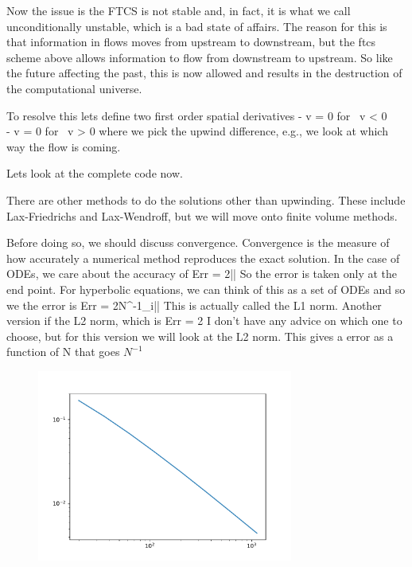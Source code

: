Now the issue is the FTCS is not stable and, in fact, it is what we call unconditionally unstable, which is a bad state of affairs.  The reason for this is that information in flows moves from upstream to downstream, but the ftcs scheme above allows information to flow from downstream to upstream.  So like the future affecting the past, this is now allowed and results in the destruction of the computational universe.  

To resolve this lets define two first order spatial derivatives
\be
{} - v = 0 \qquad\textrm{for\ } v < 0\\
 - v = 0 \qquad\textrm{for\ } v > 0 
\ee
where we pick the upwind difference, e.g., we look at which way the flow is coming.  

Lets look at the complete code now.



There are other methods to do the solutions other than upwinding.  These include Lax-Friedrichs and Lax-Wendroff, but we will move onto finite volume methods.   

Before doing so, we should discuss convergence. Convergence is the measure of how accurately a numerical method reproduces the exact solution.  In the case of ODEs, we care about the accuracy of 
\be
{\rm Err} = 2\left|\right|
\ee
So the error is taken only at the end point.  For hyperbolic equations, we can think of this as a set of ODEs and so we the error is 
\be
{\rm Err} = 2N^{-1}\sum_i\left|\right|
\ee
This is actually called the L1 norm. Another version if the L2 norm, which is 
\be
{\rm Err} = 2
\ee
I don't have any advice on which one to choose, but for this version we will look at the L2 norm.  This gives a error as a function of N that goes $N^{-1}$
\begin{figure}
    \centering\includegraphics[width=0.75\textwidth]{code/advect_conv.pdf}
    \caption{\label{fig:advect_conv}}
\end{figure}

